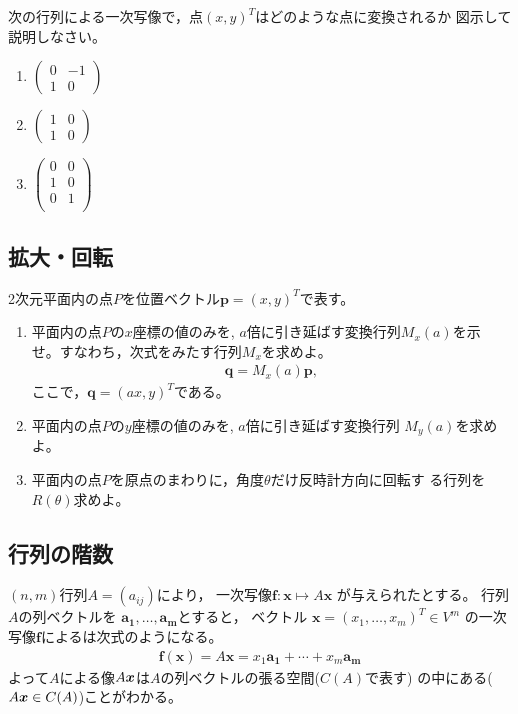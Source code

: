 \documentclass[twocolumn,11pt]{jarticle}
\begin{document}
次の行列による一次写像で，点$(x, y)^T$はどのような点に変換されるか
図示して説明しなさい。
\begin{enumerate}
\item \qquad$
  \left(
   \begin{array}{cc}
     0 & -1 \\
     1 & 0
   \end{array}\right)
$
\item \qquad$
  \left(
   \begin{array}{cc}
      1 & 0 \\
      1 & 0
   \end{array}\right)
$
\item \qquad$
  \left(
   \begin{array}{cc}
      0 & 0 \\
      1 & 0 \\
      0 & 1 \\
   \end{array}\right)
$
\end{enumerate}

\subsection{拡大・回転}

\question
2次元平面内の点$P$を位置ベクトル$\boldsymbol{p}={(x,y)^T}$で表す。
\begin{enumerate}
\item 平面内の点$P$の$x$座標の値のみを, $a$倍に引き延ばす変換行列$M_x(a)$を示
  せ。すなわち，次式をみたす行列$M_x$を求めよ。
  \begin{align}
    \boldsymbol{q}=M_x(a)\boldsymbol{p},
  \end{align}
  ここで，$\boldsymbol{q}={(ax,y)^T}$である。
\item 平面内の点$P$の$y$座標の値のみを, $a$倍に引き延ばす変換行列
  $M_y(a)$を求めよ。
\item 平面内の点$P$を原点のまわりに，角度$\theta$だけ反時計方向に回転す
  る行列を$R(\theta)$求めよ。
\end{enumerate}


\subsection{行列の階数}

$(n,m)$行列$A=(a_{ij})$により，
一次写像$\boldsymbol{f}: \boldsymbol{x}\mapsto A\boldsymbol{x}$
が与えられたとする。
行列$A$の列ベクトルを
$\boldsymbol{a_1},\ldots,\boldsymbol{a_m}$とすると， 
ベクトル
$\boldsymbol{x}=(x_1,\ldots,x_m)^T\in V^{m}$
の一次写像$\boldsymbol{f}$によるは次式のようになる。
\begin{align}
  \label{eq:matrix-decomposition}
  \boldsymbol{f}(\boldsymbol{x})
  =A\boldsymbol{x}=x_1\boldsymbol{a_1}+\cdots+x_m\boldsymbol{a_m}
\end{align}
よって$A$による像$A\boldsymbol{x}$は$A$の列ベクトルの張る空間($C(A)$で表す)
の中にある($A\boldsymbol{x}\in C(A)$)ことがわかる。
\end{document}
